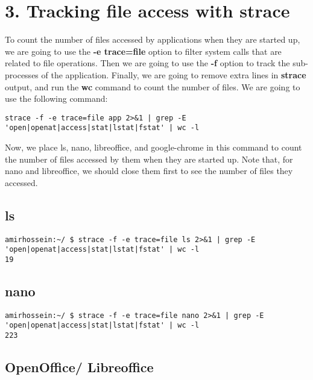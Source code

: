 \documentclass[12pt]{article}
\begin{document}
\newpage

\section{3. Tracking file access with strace}

To count the number of files accessed by applications when they are started up, we are going to use the \textbf{-e trace=file} option to filter system calls that are related to file operations. Then we are going to use the \textbf{-f} option to track the sub-processes of the application. Finally, we are going to remove extra lines in \textbf{strace} output, and run the \textbf{wc} command to count the number of files. We are going to use the following command:

{\fontsize{10pt}{10pt}\selectfont
\begin{verbatim}
strace -f -e trace=file app 2>&1 | grep -E 'open|openat|access|stat|lstat|fstat' | wc -l
\end{verbatim}
}

Now, we place ls, nano, libreoffice, and google-chrome in this command to count the number of files accessed by them when they are started up. Note that, for nano and libreoffice, we should close them first to see the number of files they accessed.

\subsection{ls}

{\fontsize{8pt}{10pt}\selectfont
\begin{verbatim}
amirhossein:~/ $ strace -f -e trace=file ls 2>&1 | grep -E 'open|openat|access|stat|lstat|fstat' | wc -l
19
\end{verbatim}
}

\subsection{nano}

{\fontsize{8pt}{10pt}\selectfont
\begin{verbatim}
amirhossein:~/ $ strace -f -e trace=file nano 2>&1 | grep -E 'open|openat|access|stat|lstat|fstat' | wc -l
223
\end{verbatim}
}

\subsection{OpenOffice/ Libreoffice}
\end{document}

